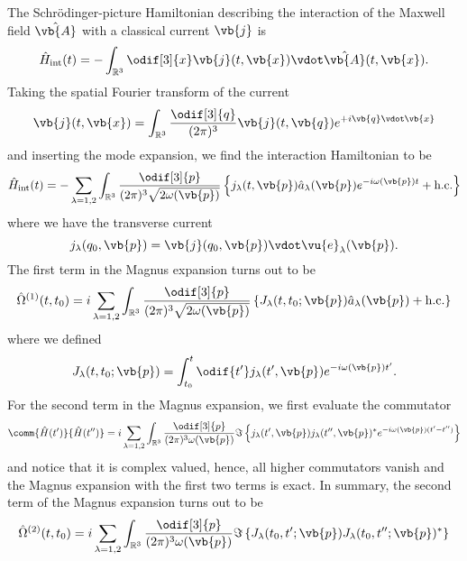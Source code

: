 The Schrödinger-picture Hamiltonian describing the interaction of the Maxwell field $\hat{\vb{A}}$ with a classical current $\vb{j}$ is
\begin{equation}
	\hat{H}_\text{int}(t)
	=
	-
	\int_{\mathbb{R}^3}\odif[3]{x}
	\vb{j}(t,\vb{x})
	\vdot
	\hat{\vb{A}}(t,\vb{x})
	.
\end{equation}
Taking the spatial Fourier transform of the current
\begin{equation}
	\vb{j}(t,\vb{x})
	=
	\int_{\mathbb{R}^3}\frac{\odif[3]{q}}{(2\pi)^3}
	\vb{j}(t,\vb{q})
	e^{+i\vb{q}\vdot\vb{x}}
\end{equation}
and inserting the mode expansion, we find the interaction Hamiltonian to be
\begin{equation}
	\hat{H}_\text{int}(t)
	=
	-
	\sum_{\lambda=1,2}
	\int_{\mathbb{R}^3}\frac{\odif[3]{p}}{(2\pi)^3\sqrt{2\omega(\vb{p})}}
	\left\{
		j_\lambda(t,\vb{p})
		\hat{a}_\lambda(\vb{p})
		e^{-i\omega(\vb{p})t}
		+
		\text{h.c.}
	\right\}
\end{equation}
where we have the transverse current
\begin{equation}
	j_\lambda(q_0,\vb{p})
	=
	\vb{j}(q_0,\vb{p})
	\vdot
	\vu{e}_\lambda(\vb{p})
	.
\end{equation}
The first term in the Magnus expansion turns out to be
\begin{equation}
	\hat{\Omega}^{(1)}(t,t_0)
	=
	i
	\sum_{\lambda=1,2}
	\int_{\mathbb{R}^3}\frac{\odif[3]{p}}{(2\pi)^3\sqrt{2\omega(\vb{p})}}
	\left\{
		J_\lambda(t,t_0;\vb{p})
		\hat{a}_\lambda(\vb{p})
		+
		\text{h.c.}
	\right\}
\end{equation}
where we defined
\begin{equation}
	J_\lambda(t,t_0;\vb{p})
	=
	\int_{t_0}^t\odif{t^\prime}
	j_\lambda(t^\prime,\vb{p})
	e^{-i\omega(\vb{p})t^\prime}
	.
\end{equation}
For the second term in the Magnus expansion, we first evaluate the commutator
\begin{equation}
	\comm{\hat{H}(t^\prime)}{\hat{H}(t^{\prime\prime})}
	=
	i\sum_{\lambda=1,2}
	\int_{\mathbb{R}^3}\frac{\odif[3]{p}}{(2\pi)^3\omega(\vb{p})}
	\Im\left\{
		j_\lambda(t^\prime,\vb{p})
		j_\lambda(t^{\prime\prime},\vb{p})^*
		e^{-i\omega(\vb{p})(t^\prime-t^{\prime\prime})}
	\right\}
\end{equation}
and notice that it is complex valued, hence, all higher commutators vanish and the Magnus expansion with the first two terms is exact.
In summary, the second term of the Magnus expansion turns out to be
\begin{equation}
	\hat{\Omega}^{(2)}(t,t_0)
	=
	i\sum_{\lambda=1,2}
	\int_{\mathbb{R}^3}\frac{\odif[3]{p}}{(2\pi)^3\omega(\vb{p})}
	\Im\left\{
		J_\lambda(t_0,t^\prime;\vb{p})
		J_\lambda(t_0,t^{\prime\prime};\vb{p})^*
	\right\}
\end{equation}
